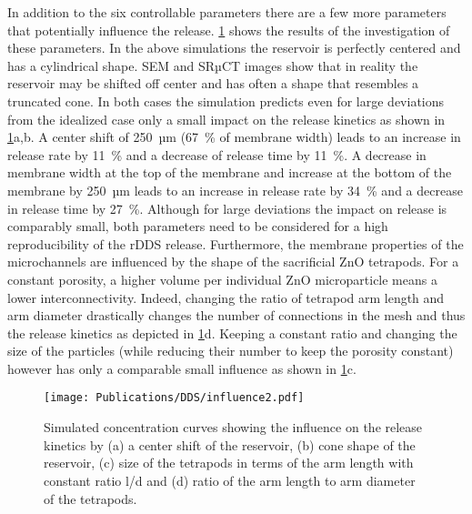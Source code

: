 In addition to the six controllable parameters there are a few more parameters that potentially influence the release. \cref{fig:influence2} shows the results of the investigation of these parameters. In the above simulations the reservoir is perfectly centered and has a cylindrical shape. SEM and SRµCT images show that in reality the reservoir may be shifted off center and has often a shape that resembles a truncated cone. In both cases the simulation predicts even for large deviations from the idealized case only a small impact on the release kinetics as shown in \cref{fig:influence2}a,b. A center shift of 250~µm (67~\% of membrane width) leads to an increase in release rate by 11~\% and a decrease of release time by 11~\%. A decrease in membrane width at the top of the membrane and increase at the bottom of the membrane by 250~µm leads to an increase in release rate by 34~\% and a decrease in release time by 27~\%. Although for large deviations the impact on release is comparably small, both parameters need to be considered for a high reproducibility of the rDDS release. Furthermore, the membrane properties of the microchannels are influenced by the shape of the sacrificial ZnO tetrapods. For a constant porosity, a higher volume per individual ZnO microparticle means a lower interconnectivity. Indeed, changing the ratio of tetrapod arm length and arm diameter drastically changes the number of connections in the mesh and thus the release kinetics as depicted in \cref{fig:influence2}d. Keeping a constant ratio and changing the size of the particles (while reducing their number to keep the porosity constant) however has only a comparable small influence as shown in \cref{fig:influence2}c. 
\begin{figure}[h!]
  \centering
  \texttt{[image: Publications/DDS/influence2.pdf]}
  \caption{Simulated concentration curves showing the influence on the release kinetics by (a) a center
  shift of the reservoir, (b) cone shape of the reservoir, (c) size of the tetrapods in terms of the arm
  length with constant ratio l/d and (d) ratio of the arm length to arm diameter of the tetrapods.}
  \label{fig:influence2}
\end{figure}

